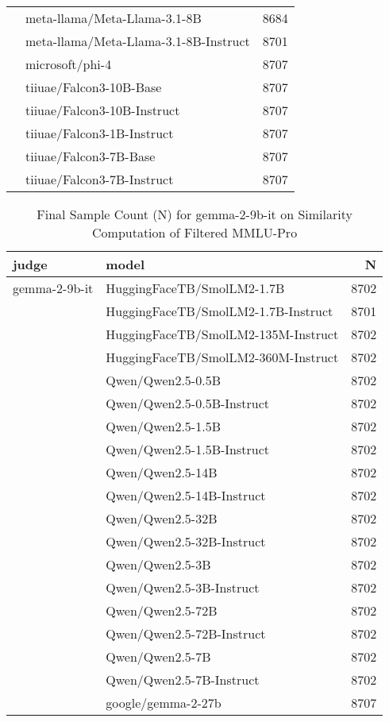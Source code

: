 \begin{table}[]
\begin{tabular}{llr}
 & meta-llama/Meta-Llama-3.1-8B & 8684 \\
 & meta-llama/Meta-Llama-3.1-8B-Instruct & 8701 \\
 & microsoft/phi-4 & 8707 \\
 & tiiuae/Falcon3-10B-Base & 8707 \\
 & tiiuae/Falcon3-10B-Instruct & 8707 \\
 & tiiuae/Falcon3-1B-Instruct & 8707 \\
 & tiiuae/Falcon3-7B-Base & 8707 \\
 & tiiuae/Falcon3-7B-Instruct & 8707 \\
\bottomrule
\end{tabular}
    \label{tab:Llama-3.3-70B-Instruct}
\end{table}

\begin{table}[]
    \centering
     \caption{Final Sample Count (N) for gemma-2-9b-it on Similarity Computation of Filtered MMLU-Pro}
\begin{tabular}{llr}
\toprule
judge & model & N \\
\midrule
gemma-2-9b-it & HuggingFaceTB/SmolLM2-1.7B & 8702 \\
 & HuggingFaceTB/SmolLM2-1.7B-Instruct & 8701 \\
 & HuggingFaceTB/SmolLM2-135M-Instruct & 8702 \\
 & HuggingFaceTB/SmolLM2-360M-Instruct & 8702 \\
 & Qwen/Qwen2.5-0.5B & 8702 \\
 & Qwen/Qwen2.5-0.5B-Instruct & 8702 \\
 & Qwen/Qwen2.5-1.5B & 8702 \\
 & Qwen/Qwen2.5-1.5B-Instruct & 8702 \\
 & Qwen/Qwen2.5-14B & 8702 \\
 & Qwen/Qwen2.5-14B-Instruct & 8702 \\
 & Qwen/Qwen2.5-32B & 8702 \\
 & Qwen/Qwen2.5-32B-Instruct & 8702 \\
 & Qwen/Qwen2.5-3B & 8702 \\
 & Qwen/Qwen2.5-3B-Instruct & 8702 \\
 & Qwen/Qwen2.5-72B & 8702 \\
 & Qwen/Qwen2.5-72B-Instruct & 8702 \\
 & Qwen/Qwen2.5-7B & 8702 \\
 & Qwen/Qwen2.5-7B-Instruct & 8702 \\
 & google/gemma-2-27b & 8707 \\

\end{tabular}
\end{table}
